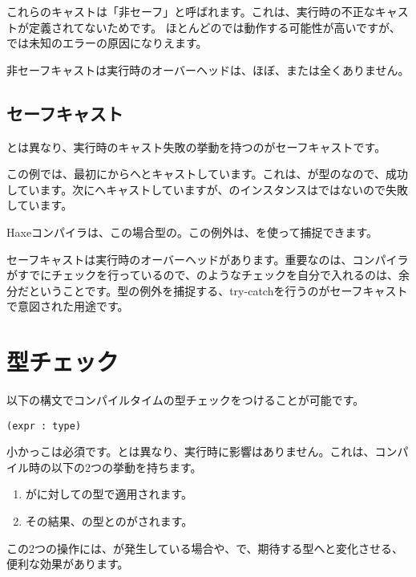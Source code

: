 これらのキャストは「非セーフ」と呼ばれます。これは、実行時の不正なキャストが定義されてないためです。 ほとんどのでは動作する可能性が高いですが、では未知のエラーの原因になりえます。

非セーフキャストは実行時のオーバーヘッドは、ほぼ、または全くありません。

\subsection{セーフキャスト}
\label{expression-cast-safe}

とは異なり、実行時のキャスト失敗の挙動を持つのがセーフキャストです。


この例では、最初にからへとキャストしています。これは、が型のなので、成功しています。次にへキャストしていますが、のインスタンスはではないので失敗しています。

Haxeコンパイラは、この場合型の。この例外は、を使って捕捉できます。

セーフキャストは実行時のオーバーヘッドがあります。重要なのは、コンパイラがすでにチェックを行っているので、のようなチェックを自分で入れるのは、余分だということです。型の例外を捕捉する、try-catchを行うのがセーフキャストで意図された用途です。

\section{型チェック}
\label{expression-type-check}

以下の構文でコンパイルタイムの型チェックをつけることが可能です。

\begin{lstlisting}
(expr : type)
\end{lstlisting}

小かっこは必須です。とは異なり、実行時に影響はありません。これは、コンパイル時の以下の2つの挙動を持ちます。

\begin{enumerate}
\item {}がに対しての型で適用されます。
\item その結果、の型とのがされます。
\end{enumerate}

この2つの操作には、が発生している場合や、で、期待する型へと変化させる、便利な効果があります。

